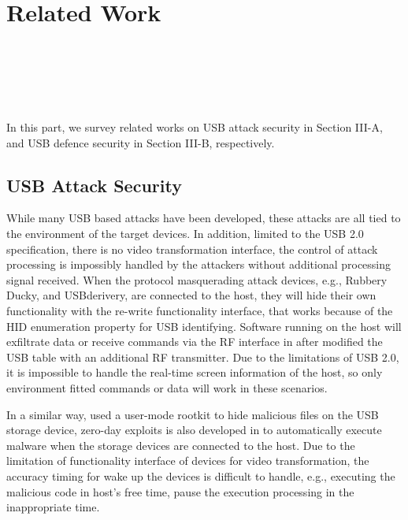 \section{Related Work}
\label{sec:related_work}
\\
\\
\\
\\
\\

In this part, we survey related works on USB attack security in Section III-A, and USB defence security in Section III-B, respectively.

\subsection{USB Attack Security}
While many USB based  attacks have been developed, these attacks are all tied to the environment of the target devices. In addition, limited to the USB 2.0\cite{usb20} specification, there is no video transformation interface, the control of attack processing is impossibly handled by the attackers without additional processing signal received. When the  protocol masquerading attack devices, e.g., Rubbery Ducky\cite{rubber}, \cite{rubberducky2020} and USBderivery\cite{usbdriver}, are connected to the host, they will hide their own functionality with the re-write functionality interface, that works because of the HID enumeration property for USB identifying. Software running on the host will exfiltrate data or receive commands via the RF interface in \cite{turnip} after modified the USB table with an additional RF transmitter. Due to the limitations of USB 2.0, it is impossible to handle the real-time screen information of the host, so only environment fitted commands or data will work in these scenarios.

In a similar way, \cite{duqu} used a user-mode rootkit to hide malicious files on the USB storage device, zero-day exploits is also developed in \cite{zero-day} to automatically execute malware when the storage devices are connected to the host. Due to the limitation of functionality interface of devices for video transformation, the accuracy timing for wake up the devices is difficult to handle, e.g., executing the malicious code in host's free time, pause the execution processing in the inappropriate time. 

